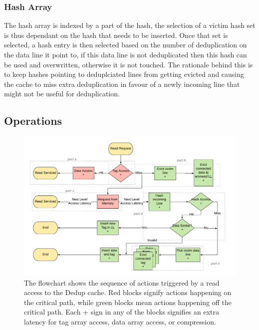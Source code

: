 \subsubsection{Hash Array}
\label{sssec:DedupHashRepl}
The hash array is indexed by a part of the hash, the selection of a victim hash set is thus dependant on the hash that needs to be inserted. Once that set is selected, a hash entry is then selected based on the number of deduplication on the data line it point to, if this data line is not deduplicated then this hash can be used and overwritten, otherwise it is not touched. The rationale behind this is to keep hashes pointing to deduplciated lines from getting evicted and causing the cache to miss extra deduplication in favour of a newly incoming line that might not be useful for deduplication.\par

\subsection{Operations}
\label{ssec:DedupOperations}
\begin{figure}[h]
    \includegraphics[width=\textwidth]{Dedup_Read.pdf}
    \caption[Dedup Read]{The flowchart shows the sequence of actions triggered by a read access to the Dedup cache. Red blocks signify actions happening on the critical path, while green blocks mean actions happening off the critical path. Each + sign in any of the blocks signifies an extra latency for tag array access, data array access, or compression.}
    \label{fig:Dedup_Read}
\end{figure}
